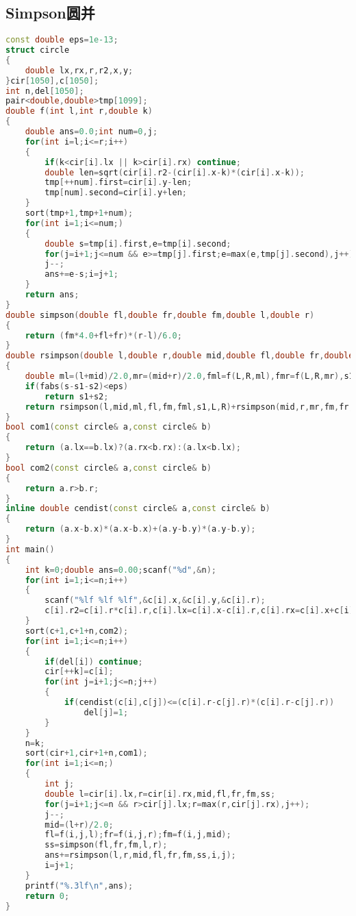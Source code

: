 \subsection{Simpson圆并}
    \begin{lstlisting}[language=c++]
const double eps=1e-13;
struct circle
{
	double lx,rx,r,r2,x,y;	
}cir[1050],c[1050];
int n,del[1050];
pair<double,double>tmp[1099];
double f(int l,int r,double k)
{
	double ans=0.0;int num=0,j;
	for(int i=l;i<=r;i++)
	{
		if(k<cir[i].lx || k>cir[i].rx) continue;	
		double len=sqrt(cir[i].r2-(cir[i].x-k)*(cir[i].x-k));
		tmp[++num].first=cir[i].y-len;
		tmp[num].second=cir[i].y+len;
	}		
	sort(tmp+1,tmp+1+num);
	for(int i=1;i<=num;)
	{
		double s=tmp[i].first,e=tmp[i].second;
		for(j=i+1;j<=num && e>=tmp[j].first;e=max(e,tmp[j].second),j++);	
		j--;
		ans+=e-s;i=j+1;
	}
	return ans;
}
double simpson(double fl,double fr,double fm,double l,double r)
{
    return (fm*4.0+fl+fr)*(r-l)/6.0;
}
double rsimpson(double l,double r,double mid,double fl,double fr,double fm,double s,int L,int R)
{
	double ml=(l+mid)/2.0,mr=(mid+r)/2.0,fml=f(L,R,ml),fmr=f(L,R,mr),s1=simpson(fl,fm,fml,l,mid),s2=simpson(fm,fr,fmr,mid,r);
	if(fabs(s-s1-s2)<eps) 
        return s1+s2;
	return rsimpson(l,mid,ml,fl,fm,fml,s1,L,R)+rsimpson(mid,r,mr,fm,fr,fmr,s2,L,R);	
}
bool com1(const circle& a,const circle& b)
{
	return (a.lx==b.lx)?(a.rx<b.rx):(a.lx<b.lx);	
}
bool com2(const circle& a,const circle& b)
{
	return a.r>b.r;	
}
inline double cendist(const circle& a,const circle& b)
{
	return (a.x-b.x)*(a.x-b.x)+(a.y-b.y)*(a.y-b.y);	
}
int main()
{
	int k=0;double ans=0.00;scanf("%d",&n);
	for(int i=1;i<=n;i++)
	{
		scanf("%lf %lf %lf",&c[i].x,&c[i].y,&c[i].r);
		c[i].r2=c[i].r*c[i].r,c[i].lx=c[i].x-c[i].r,c[i].rx=c[i].x+c[i].r;	
	}	
	sort(c+1,c+1+n,com2);
	for(int i=1;i<=n;i++)
	{
		if(del[i]) continue;
		cir[++k]=c[i];
		for(int j=i+1;j<=n;j++)
		{
			if(cendist(c[i],c[j])<=(c[i].r-c[j].r)*(c[i].r-c[j].r))	
                del[j]=1;
		}	
	}
	n=k;
	sort(cir+1,cir+1+n,com1);
	for(int i=1;i<=n;)
	{
		int j;
        double l=cir[i].lx,r=cir[i].rx,mid,fl,fr,fm,ss;
		for(j=i+1;j<=n && r>cir[j].lx;r=max(r,cir[j].rx),j++);
		j--; 
		mid=(l+r)/2.0;
		fl=f(i,j,l);fr=f(i,j,r);fm=f(i,j,mid);
		ss=simpson(fl,fr,fm,l,r);
		ans+=rsimpson(l,r,mid,fl,fr,fm,ss,i,j);
		i=j+1;	
	}	
	printf("%.3lf\n",ans);
	return 0;
}
    \end{lstlisting}
